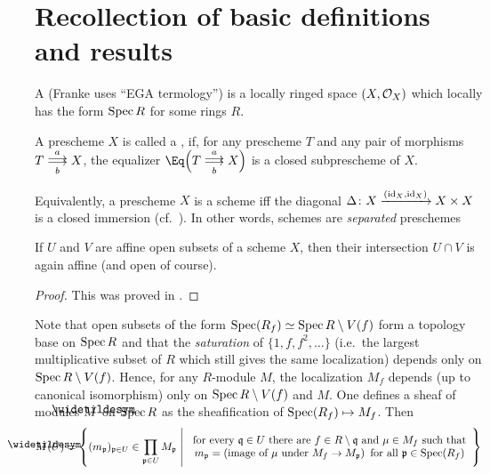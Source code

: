 \documentclass[a4paper,parskip=half,numbers=enddot, DIV=12]{scrreprt}
\begin{document}
\section{Recollection of basic definitions and results}
\begin{defi}
	\begin{alphanumerate}
		\item A  (Franke uses ``EGA termology'') is a locally ringed space $(X,\mathcal{O}_X)$ which locally has the form $\operatorname{Spec} R$ for some rings $R$.
		\item A prescheme $X$ is called a , if, for any prescheme $T$ and any pair of morphisms $T\doublemorphism[a][b]X$, the equalizer $\Eq\Big(T\doublemorphism[a][b]X\Big)$ is a closed subprescheme of $X$.
	\end{alphanumerate}
\end{defi}
\begin{rem*}
	Equivalently, a prescheme $X$ is a scheme iff the diagonal $\Delta\colon X\xrightarrow{(\operatorname{id}_X,\operatorname{id}_X)}X\times X$ is a closed immersion (cf.\ \cite[Fact~1.5.8]{alggeo1}). In other words, schemes are \emph{separated} preschemes
\end{rem*}
\begin{prop}
	If $U$ and $V$ are affine open subsets of a scheme $X$, then their intersection $U\cap V$ is again affine (and open of course).
\end{prop}
\begin{proof}
	This was proved in \cite[Proposition~1.5.4]{alggeo1}.
\end{proof}
	Note that open subsets of the form $\operatorname{Spec}(R_f)\simeq \operatorname{Spec} R\setminus V(f)$ form a topology base on $\operatorname{Spec} R$ and that the \emph{saturation} of $\{1,f,f^2,\ldots\}$ (i.e.\ the largest multiplicative subset of $R$ which still gives the same localization) depends only on $\operatorname{Spec} R\setminus V(f)$. Hence, for any $R$-module $M$, the localization $M_f$ depends (up to canonical isomorphism) only on $\operatorname{Spec} R\setminus V(f)$ and $M$. One defines a sheaf of modules $\snake{M}$ on $\operatorname{Spec} R$ as the sheafification of $\operatorname{Spec} (R_f)\mapsto M_f$. Then
	\begin{align*}
		\snake{M}(U)=\left\{(m_\pp)_{\pp\in U}\in\prod_{\pp\in U}M_\pp\st
		\begin{array}{c}
			\text{for every }\qq\in U\text{ there are }f\in R\setminus\qq\text{ and }\mu\in M_f\text{ such that}\\
			m_\pp=\left(\text{image of }\mu\text{ under }M_f\morphism M_\pp\right)\text{ for all }\pp\in\Spec (R_f)
		\end{array}
		\right\}
	\end{align*}
\end{document}
